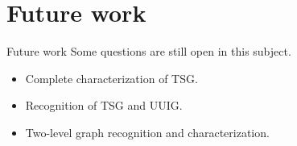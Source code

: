 \section{Future work}

\begin{frame}{Future work}
  Some questions are still open in this subject.
  \begin{itemize}[<+->]
    \item Complete characterization of TSG.
    \item Recognition of TSG and UUIG.
    \item Two-level graph recognition and characterization.
  \end{itemize}
\end{frame}

